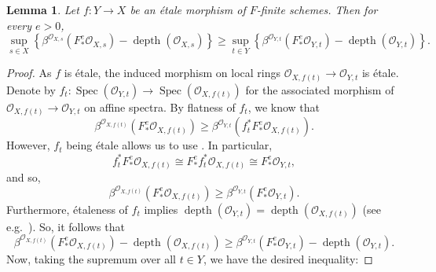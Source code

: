 \documentclass[11pt]{amsart}
\theoremstyle{plain}
\newtheorem{lemma}[theorem]{Lemma}
\theoremstyle{definition}
\numberwithin{equation}{section}
\numberwithin{theorem}{section}
\begin{document}
\begin{lemma}
    \label{lem:bound_along_etale}
    Let $f\colon Y \to X$ be an \'{e}tale morphism of $F$-finite schemes. 
    Then for every $e>0$,
    \begin{displaymath}
        \sup_{s\in X} \left\{ \beta^{\mathcal{O}_{X,s}} (F_\ast^e \mathcal{O}_{X,s}) - \operatorname{depth}(\mathcal{O}_{X,s})  \right\} \geq \sup_{t\in Y} \left\{ \beta^{\mathcal{O}_{Y,t}} (F_\ast^e \mathcal{O}_{Y,t}) - \operatorname{depth}(\mathcal{O}_{Y,t}) \right\}.
    \end{displaymath}
\end{lemma}

\begin{proof}
    As $f$ is \'{e}tale, the induced morphism on local rings $\mathcal{O}_{X,f(t)} \to \mathcal{O}_{Y,t}$ is \'{e}tale. 
    Denote by $f_t\colon \operatorname{Spec}(\mathcal{O}_{Y,t}) \to \operatorname{Spec}(\mathcal{O}_{X,f(t)})$ for the associated morphism of $\mathcal{O}_{X,f(t)} \to \mathcal{O}_{Y,t}$ on affine spectra. 
    By flatness of $f_t$, we know that
    \begin{displaymath}
        \beta^{\mathcal{O}_{X,f(t)}} (F_\ast^e \mathcal{O}_{X,f(t)}) \geq \beta^{\mathcal{O}_{Y,t}} (f_t^\ast F_\ast^e \mathcal{O}_{X,f(t)}).
    \end{displaymath}
    However, $f_t$ being \'{e}tale allows us to use . 
    In particular, 
    \begin{displaymath}
        f_t^\ast F_\ast^e \mathcal{O}_{X,f(t)} \cong F_\ast^e f_t^\ast \mathcal{O}_{X,f(t)} \cong F_\ast^e \mathcal{O}_{Y,t},
    \end{displaymath}
    and so,
    \begin{displaymath}
        \beta^{\mathcal{O}_{X,f(t)}} (F_\ast^e \mathcal{O}_{X,f(t)}) \geq \beta^{\mathcal{O}_{Y,t}} (F_\ast^e \mathcal{O}_{Y,t}).
    \end{displaymath}
    Furthermore, \'{e}taleness of $f_t$ implies $\operatorname{depth}(\mathcal{O}_{Y,t}) = \operatorname{depth}(\mathcal{O}_{X,f(t)})$ (see e.g.\ \cite[\href{https://stacks.math.columbia.edu/tag/039T}{Tag 039T}]{stacks-project}). 
    So, it follows that
    \begin{displaymath}
        \beta^{\mathcal{O}_{X,f(t)}} (F_\ast^e \mathcal{O}_{X,f(t)}) - \operatorname{depth}(\mathcal{O}_{X,f(t)}) \geq \beta^{\mathcal{O}_{Y,t}} (F_\ast^e \mathcal{O}_{Y,t}) - \operatorname{depth}(\mathcal{O}_{Y,t}).
    \end{displaymath}
    Now, taking the supremum over all $t\in Y$, we have the desired inequality:

\end{proof}
\end{document}
